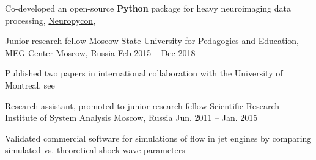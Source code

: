 \begin{cventries}
{\begin{cvitems}
          \item{Co-developed an open-source \textbf{Python} package for heavy neuroimaging data processing, \href{https://github.com/neuropycon}{Neuropycon}, \cite{Neuropycon}}
      \end{cvitems}
    }
  \cventry
    {Junior research fellow}
    {Moscow State University for Pedagogics and Education, MEG Center}
    {Moscow, Russia}
    {Feb 2015 -- Dec 2018}
    {
      \begin{cvitems}
      \item{Published two papers in international collaboration with the University of Montreal, see \cite{Alamian2017a, Alamian2017b}}
      \end{cvitems}
    }
  \cventry
    {Research assistant, promoted to junior research fellow}
    {Scientific Research Institute of System Analysis}
    {Moscow, Russia}
    {Jun. 2011 -- Jan. 2015}
    {
      \begin{cvitems}
        \item{Validated commercial software for simulations of flow in jet engines by comparing simulated vs. theoretical shock wave parameters}
      \end{cvitems}
    }
\end{cventries}
